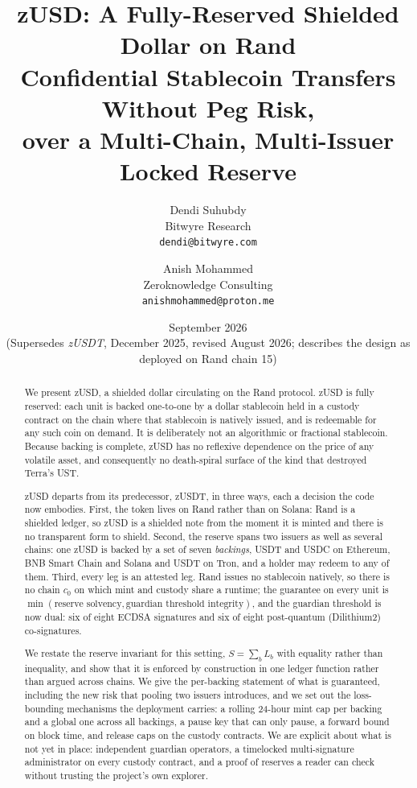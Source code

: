 \documentclass[11pt,a4paper]{article}
\title{\textbf{zUSD: A Fully-Reserved Shielded Dollar on Rand}\\[0.5em]
\large Confidential Stablecoin Transfers Without Peg Risk,\\over a Multi-Chain, Multi-Issuer Locked Reserve}
\author{Dendi Suhubdy\\
Bitwyre Research\\
\texttt{dendi@bitwyre.com}
\and
Anish Mohammed\\
Zeroknowledge Consulting\\
\texttt{anishmohammed@proton.me}}
\date{September 2026 \\ \small (Supersedes \emph{zUSDT}, December 2025, revised August 2026; describes the design as deployed on Rand chain 15)}
\begin{document}
\maketitle

\begin{abstract}
We present zUSD, a shielded dollar circulating on the Rand protocol. zUSD is fully reserved: each unit is backed one-to-one by a dollar stablecoin held in a custody contract on the chain where that stablecoin is natively issued, and is redeemable for any such coin on demand. It is deliberately not an algorithmic or fractional stablecoin. Because backing is complete, zUSD has no reflexive dependence on the price of any volatile asset, and consequently no death-spiral surface of the kind that destroyed Terra's UST.

zUSD departs from its predecessor, zUSDT, in three ways, each a decision the code now embodies. First, the token lives on Rand rather than on Solana: Rand is a shielded ledger, so zUSD is a shielded note from the moment it is minted and there is no transparent form to shield. Second, the reserve spans two issuers as well as several chains: one zUSD is backed by a set of seven \emph{backings}, USDT and USDC on Ethereum, BNB Smart Chain and Solana and USDT on Tron, and a holder may redeem to any of them. Third, every leg is an attested leg. Rand issues no stablecoin natively, so there is no chain $c_0$ on which mint and custody share a runtime; the guarantee on every unit is $\min(\text{reserve solvency}, \text{guardian threshold integrity})$, and the guardian threshold is now dual: six of eight ECDSA signatures and six of eight post-quantum (Dilithium2) co-signatures.

We restate the reserve invariant for this setting, $S = \sum_b L_b$ with equality rather than inequality, and show that it is enforced by construction in one ledger function rather than argued across chains. We give the per-backing statement of what is guaranteed, including the new risk that pooling two issuers introduces, and we set out the loss-bounding mechanisms the deployment carries: a rolling 24-hour mint cap per backing and a global one across all backings, a pause key that can only pause, a forward bound on block time, and release caps on the custody contracts. We are explicit about what is not yet in place: independent guardian operators, a timelocked multi-signature administrator on every custody contract, and a proof of reserves a reader can check without trusting the project's own explorer.
\end{abstract}
\end{document}
